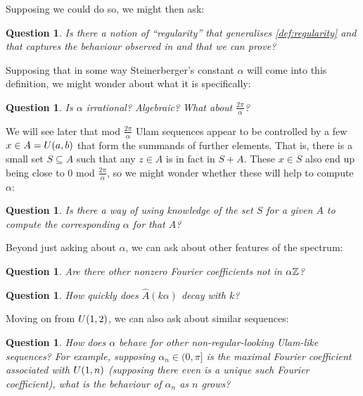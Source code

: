 \documentclass{report}
\newtheorem{question}[theorem]{Question}
\theoremstyle{remark}
\numberwithin{equation}{section}
\begin{document}
Supposing we could do so, we might then ask:

\begin{question}\label{qn:regularity_def}
  Is there a notion of ``regularity'' that generalises
  \ref{def:regularity} and that captures the behaviour observed in
  \cite{steinerberger:preprint} and that we can prove?
\end{question}

Supposing that in some way Steinerberger's constant $\alpha$ will come
into this definition, we might wonder about what it is specifically:

\begin{question}\label{qn:rationality}
  Is $\alpha$ irrational?  Algebraic?  What about
  $\frac{2\pi}{\alpha}$?  
\end{question}

We will see later that mod $\frac{2\pi}{\alpha}$ Ulam sequences appear
to be controlled by a few $x \in A =U(a,b)$ that form the
summands of further elements.  That is, there is a small set
$S \subseteq A$ such that any $z \in A$ is in fact in $S+A$.  These $x
\in S$ also end up being close to 0 mod $\frac{2\pi}{\alpha}$, so we
might wonder whether these will help to compute $\alpha$: 

\begin{question}\label{qn:compute_alpha}
  Is there a way of using knowledge of the set $S$ for a given $A$ to
  compute the corresponding $\alpha$ for that $A$?
\end{question}

Beyond just asking about $\alpha$, we can ask about other features of
the spectrum: 

\begin{question}\label{qn:spectrum}
  Are there other nonzero Fourier coefficients not in $\alpha\mathbb{Z}$?
\end{question}

\begin{question}\label{qn:decay}
  How quickly does $\widehat{A}(k\alpha)$ decay with $k$?
\end{question}

Moving on from $U(1,2)$, we can also ask about similar sequences: 

\begin{question}\label{qn:other_alpha}
  How does $\alpha$ behave for other non-regular-looking Ulam-like
  sequences?  For example, supposing $\alpha_n \in (0,\pi]$ is the
  maximal Fourier coefficient associated with $U(1,n)$ (supposing
  there even is a unique such Fourier coefficient), what is the
  behaviour of $\alpha_n$ as $n$ grows?
\end{question}
\end{document}
